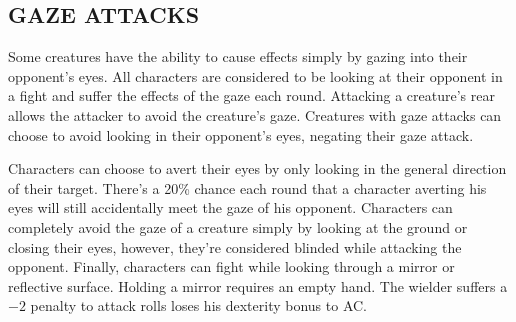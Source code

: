 \begin{multicols}{2}
\subsection{GAZE ATTACKS}

Some creatures have the ability to cause effects simply by gazing into their opponent's eyes.  All characters are considered to be looking at their opponent in a fight and suffer the effects of the gaze each round.  Attacking a creature's rear allows the attacker to avoid the creature's gaze.  Creatures with gaze attacks can choose to avoid looking in their opponent's eyes, negating their gaze attack.

Characters can choose to avert their eyes by only looking in the general direction of their target.  There's a 20\% chance each round that a character averting his eyes will still accidentally meet the gaze of his opponent.  Characters can completely avoid the gaze of a creature simply by looking at the ground or closing their eyes, however, they're considered blinded while attacking the opponent.  Finally, characters can fight while looking through a mirror or reflective surface.  Holding a mirror requires an empty hand.  The wielder suffers a $-2$ penalty to attack rolls loses his dexterity bonus to AC.

\end{multicols}

